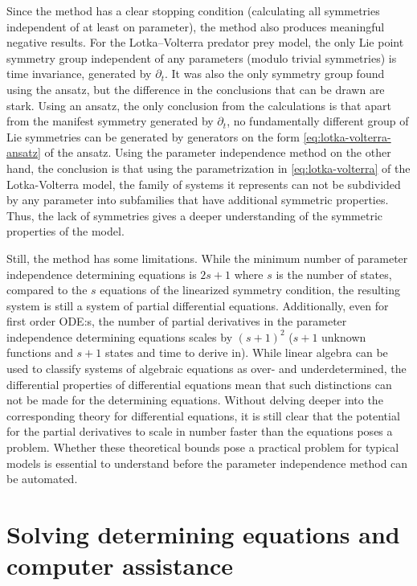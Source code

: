 Since the method has a clear stopping condition (calculating all symmetries independent of at least on parameter), the method also produces meaningful negative results.
For the Lotka--Volterra predator prey model, the only Lie point symmetry group independent of any parameters (modulo trivial symmetries) is time invariance, generated by \(\partial_t\).
It was also the only symmetry group found using the ansatz, but the difference in the conclusions that can be drawn are stark.
Using an ansatz, the only conclusion from the calculations is that apart from the manifest symmetry generated by \(\partial_t\), no fundamentally different group of Lie symmetries can be generated by generators on the form \cref{eq:lotka-volterra-ansatz} of the ansatz.
Using the parameter independence method on the other hand, the conclusion is that using the parametrization in \cref{eq:lotka-volterra} of the Lotka-Volterra model, the family of systems it represents can not be subdivided by any parameter into subfamilies that have additional symmetric properties.
Thus, the lack of symmetries gives a deeper understanding of the symmetric properties of the model.

Still, the method has some limitations.
While the minimum number of parameter independence determining equations is \(2s+1\) where \(s\) is the number of states, compared to the \(s\) equations of the linearized symmetry condition, the resulting system is still a system of partial differential equations.
Additionally, even for first order ODE:s, the number of partial derivatives in the parameter independence determining equations scales by \((s + 1)^2\) (\(s + 1\) unknown functions and \(s + 1\) states and time to derive in).
While linear algebra can be used to classify systems of algebraic equations as over- and underdetermined, the differential properties of differential equations mean that such distinctions can not be made for the determining equations.
Without delving deeper into the corresponding theory for differential equations, it is still clear that the potential for the partial derivatives to scale in number faster than the equations poses a problem.
Whether these theoretical bounds pose a practical problem for typical models is essential to understand before the parameter independence method can be automated.

\section{Solving determining equations and computer assistance}


